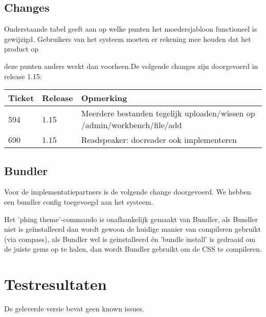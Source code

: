 \subsection{Changes}
Onderstaande tabel geeft aan op welke punten het moedersjabloon functioneel is gewijzigd. Gebruikers van het systeem moeten er rekening mee houden dat het product op

deze punten anders werkt dan voorheen.De volgende changes zijn doorgevoerd in release 1.15:

\begin{tabularx}{\linewidth}{l|l|X} \hline
Ticket & Release & Opmerking \\ \hline
594 & 1.15 & Meerdere bestanden tegelijk uploaden/wissen op /admin/workbench/file/add \\ \hline
690 & 1.15 & Readspeaker: docreader ook implementeren \\ \hline
\end{tabularx}

\subsection{Bundler}
Voor de implementatiepartners is de volgende change doorgevoerd. We hebben een bundler config toegevoegd aan het systeem.

Het 'phing theme'-commando is onafhankelijk gemaakt van Bundler, als Bundler niet is ge\"installeerd dan wordt gewoon de huidige manier van compileren gebruikt (via compass), als Bundler wel is ge\"installeerd \'en 'bundle install' is gedraaid om de juiste gems op te halen, dan wordt Bundler gebruikt om de CSS te compileren.

\section{Testresultaten}
De geleverde versie bevat geen known issues.

